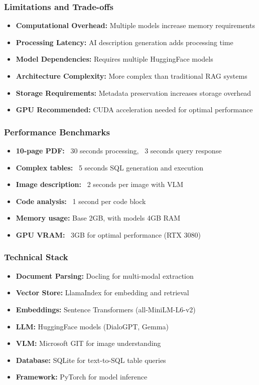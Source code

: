 \begin{frame}[fragile]\frametitle{Limitations and Trade-offs}
\begin{itemize}
\item \textbf{Computational Overhead:} Multiple models increase memory requirements
\item \textbf{Processing Latency:} AI description generation adds processing time
\item \textbf{Model Dependencies:} Requires multiple HuggingFace models
\item \textbf{Architecture Complexity:} More complex than traditional RAG systems
\item \textbf{Storage Requirements:} Metadata preservation increases storage overhead
\item \textbf{GPU Recommended:} CUDA acceleration needed for optimal performance
\end{itemize}
\end{frame}

\begin{frame}[fragile]\frametitle{Performance Benchmarks}
\begin{itemize}
\item \textbf{10-page PDF:} ~30 seconds processing, ~3 seconds query response
\item \textbf{Complex tables:} ~5 seconds SQL generation and execution
\item \textbf{Image description:} ~2 seconds per image with VLM
\item \textbf{Code analysis:} ~1 second per code block
\item \textbf{Memory usage:} Base 2GB, with models 4GB RAM
\item \textbf{GPU VRAM:} ~3GB for optimal performance (RTX 3080)
\end{itemize}
\end{frame}

\begin{frame}[fragile]\frametitle{Technical Stack}
\begin{itemize}
\item \textbf{Document Parsing:} Docling for multi-modal extraction
\item \textbf{Vector Store:} LlamaIndex for embedding and retrieval
\item \textbf{Embeddings:} Sentence Transformers (all-MiniLM-L6-v2)
\item \textbf{LLM:} HuggingFace models (DialoGPT, Gemma)
\item \textbf{VLM:} Microsoft GIT for image understanding
\item \textbf{Database:} SQLite for text-to-SQL table queries
\item \textbf{Framework:} PyTorch for model inference
\end{itemize}
\end{frame}

